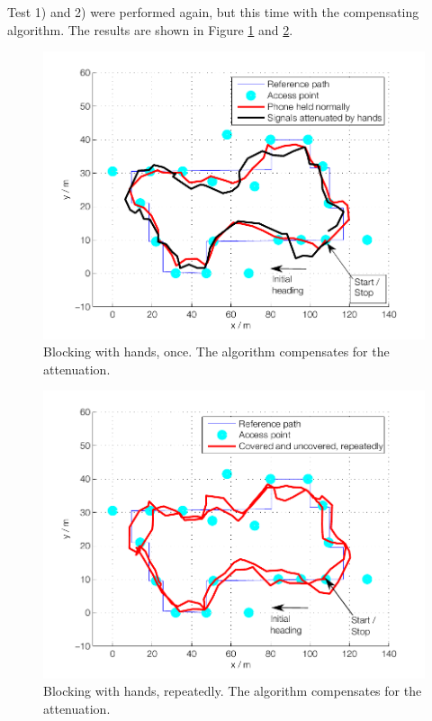 \documentclass{LTHthesis}
\begin{document}
Test 1) and 2) were performed again, but this time with the compensating algorithm. The results are shown in Figure \ref{hand_block_comp} and \ref{hand_block_repeatedly_comp}.

\begin{figure}[!htb]

\includegraphics[width=1\textwidth ]{images/adapt_parameters/hand_block_comp}
\caption{Blocking with hands, once. The algorithm compensates for the attenuation.}\label{hand_block_comp}
\end{figure}

\begin{figure}[!htb]

\includegraphics[width=1\textwidth ]{images/adapt_parameters/hand_block_repeatedly_comp}
\caption{Blocking with hands, repeatedly. The algorithm compensates for the attenuation.}\label{hand_block_repeatedly_comp}
\end{figure}
\end{document}
